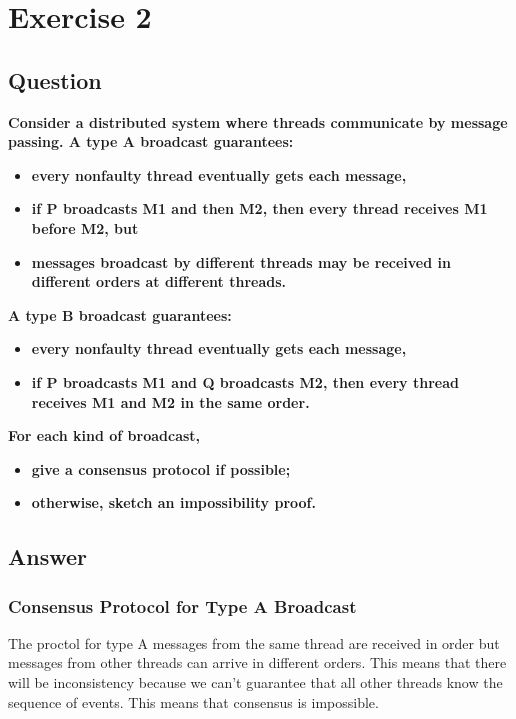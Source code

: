 \documentclass{article}
\begin{document}
\section*{Exercise 2}
\subsection*{Question}
\textbf{Consider a distributed system where threads communicate by message passing. A type A broadcast guarantees:}
\begin{itemize}
    \item \textbf{every nonfaulty thread eventually gets each message,}
    \item \textbf{if P broadcasts M1 and then M2, then every thread receives M1 before M2, but}
    \item \textbf{messages broadcast by different threads may be received in different orders at different threads.}
\end{itemize}

\textbf{A type B broadcast guarantees:}
\begin{itemize}
    \item \textbf{every nonfaulty thread eventually gets each message,}
    \item \textbf{if P broadcasts M1 and Q broadcasts M2, then every thread receives M1 and M2 in the same order.}
\end{itemize}

\textbf{For each kind of broadcast,}
\begin{itemize}
    \item \textbf{give a consensus protocol if possible;}
    \item \textbf{otherwise, sketch an impossibility proof.}
\end{itemize}

\subsection*{Answer}
\subsubsection*{Consensus  Protocol for Type A Broadcast}
The proctol for type A messages from the same thread are received in order but messages from other threads can arrive in different orders. This means that there will be inconsistency because we can't guarantee that all other threads know the sequence of events. This means that consensus is impossible.
\end{document}
